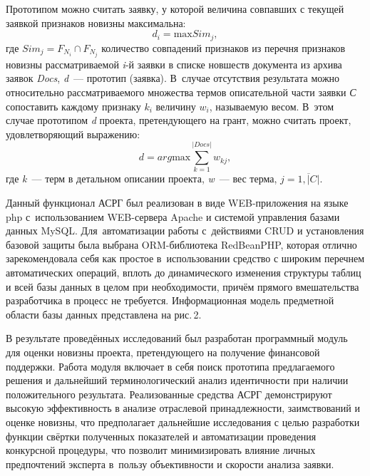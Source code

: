 Прототипом можно считать заявку, у которой величина совпавших с текущей заявкой признаков новизны максимальна:
\begin{equation}
  d_i = \text{max} Sim_j,
\end{equation}
где $Sim_j = F_{N_i} \cap F_{N_j}$ количество совпадений признаков из перечня признаков новизны рассматриваемой \textit{i}-й заявки в списке новшеств документа из архива заявок \textit{Docs}, \textit{d}~--- прототип (заявка). В~случае отсутствия результата можно относительно рассматриваемого множества термов описательной части заявки \textit{С} сопоставить каждому признаку $k_i$ величину $w_i$, называемую весом. В~этом случае прототипом \textit{d} проекта, претендующего на грант, можно считать проект, удовлетворяющий выражению:
\begin{equation}
  d = arg\text{max} \sum_{k=1}^{|Docs|}w_{kj},
\end{equation}
где \textit{k}~--- терм в детальном описании проекта, \textit{w}~--- вес терма, $j=\overline{1,|C|}$.

Данный функционал АСРГ был реализован в виде WEB-приложения на языке php с~использованием WEB-сервера Apache и системой управления базами данных MySQL. Для~автоматизации работы с~действиями CRUD и установления базовой защиты была выбрана ORM-библиотека RedBeanPHP, которая отлично зарекомендовала себя как простое в~использовании средство с широким перечнем автоматических операций, вплоть до динамического изменения структуры таблиц и всей базы данных в целом при необходимости, причём прямого вмешательства разработчика в процесс не требуется. Информационная модель предметной области базы данных представлена на рис.\,2.



В результате проведённых исследований был разработан программный модуль для оценки новизны проекта, претендующего на получение финансовой поддержки. Работа модуля включает в себя поиск прототипа предлагаемого решения и дальнейший терминологический анализ идентичности при наличии положительного результата. Реализованные средства АСРГ демонстрируют высокую эффективность в анализе отраслевой принадлежности, заимствований и оценке новизны, что предполагает дальнейшие исследования с целью разработки функции свёртки полученных показателей и автоматизации проведения конкурсной процедуры, что позволит минимизировать влияние личных предпочтений эксперта в~пользу объективности и скорости анализа заявки.


